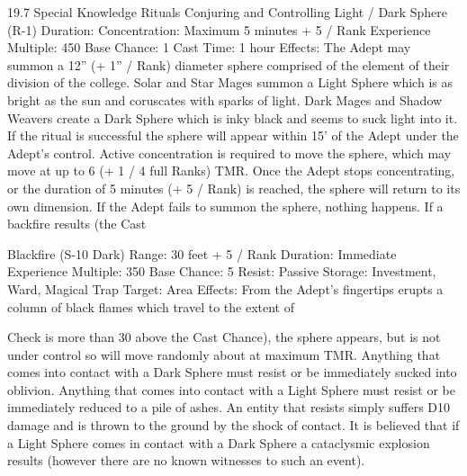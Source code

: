 \documentclass[a4paper]{article}
\begin{document}
\begin{multicols}{3}
19.7 Special Knowledge Rituals
Conjuring and Controlling Light / Dark
Sphere (R-1)
Duration: Concentration: Maximum 5 minutes + 5
/ Rank
Experience Multiple: 450
Base Chance: 1%
Cast Time: 1 hour
Effects: The Adept may summon a 12” (+ 1” /
Rank) diameter sphere comprised of the element of
their division of the college. Solar and Star Mages
summon a Light Sphere which is as bright as the
sun and coruscates with sparks of light. Dark
Mages and Shadow Weavers create a Dark Sphere
which is inky black and seems to suck light into it.
If the ritual is successful the sphere will appear
within 15’ of the Adept under the Adept’s control.
Active concentration is required to move the
sphere, which may move at up to 6 (+ 1 / 4 full
Ranks) TMR. Once the Adept stops concentrating,
or the duration of 5 minutes (+ 5 / Rank) is
reached, the sphere will return to its own dimension. If the Adept fails to summon the sphere,
nothing happens. If a backfire results (the Cast

Blackfire (S-10 Dark)
Range: 30 feet + 5 / Rank
Duration: Immediate
Experience Multiple: 350
Base Chance: 5%
Resist: Passive
Storage: Investment, Ward, Magical Trap
Target: Area
Effects: From the Adept’s fingertips erupts a column of black flames which travel to the extent of

Check is more than 30 above the Cast Chance), the
sphere appears, but is not under control so will
move randomly about at maximum TMR. Anything that comes into contact with a Dark Sphere
must resist or be immediately sucked into oblivion.
Anything that comes into contact with a Light
Sphere must resist or be immediately reduced to a
pile of ashes. An entity that resists simply suffers
D10 damage and is thrown to the ground by the
shock of contact. It is believed that if a Light
Sphere comes in contact with a Dark Sphere a
cataclysmic explosion results (however there are
no known witnesses to such an event).


\end{multicols}
\end{document}
